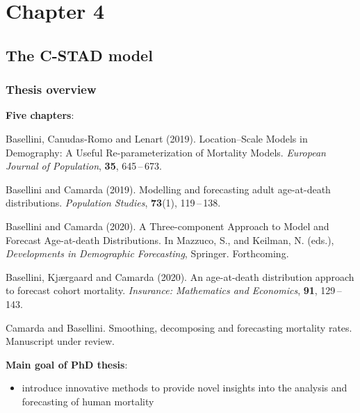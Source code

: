 \documentclass[12pt, xcolor=table]{beamer}  %
\begin{document}
\section{Chapter 4}
\subsection{The C-STAD model}
\begin{frame}[plain]\frametitle{Thesis overview}
	\textbf{Five chapters}: 
	\begin{itemize}
		\scriptsize	
		\item { Basellini, Canudas-Romo and Lenart (2019). Location--Scale Models in Demography: A Useful Re-parameterization of Mortality Models. {\it European Journal of Population}, {\bf 35}, 645\,--\,673. 	
			
		\item  Basellini and Camarda (2019). Modelling and forecasting adult age-at-death distributions. {\it Population Studies}, {\bf 73}(1), 119\,--\,138. 
		
		\item  Basellini and Camarda (2020). A Three-component Approach to Model and Forecast Age-at-death Distributions. In Mazzuco, S., and Keilman, N. (eds.), {\it Developments in Demographic Forecasting}, Springer. Forthcoming. }
		
		\item { Basellini, Kj{\ae}rgaard and Camarda (2020). An age-at-death distribution approach \\ to forecast cohort mortality. {\it Insurance: Mathematics and Economics}, {\bf 91}, 129\,--\,143. }	
			
		\item { Camarda and Basellini. Smoothing, decomposing and forecasting mortality rates. Manuscript under review. }	
	\end{itemize}
	\bigskip
	{\pgfsetfillopacity{1} 
		\textbf{Main goal of PhD thesis}: 
		\begin{itemize}
			\item introduce innovative methods to provide novel insights into the analysis and forecasting of human mortality	
		\end{itemize}
	}
\end{frame}
\end{document}
